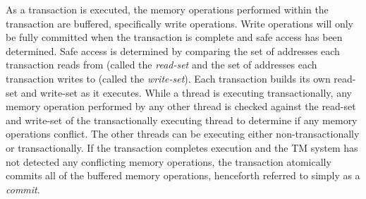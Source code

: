 \documentclass[11pt]{book}
\begin{document}





As a transaction is executed, the memory operations performed within the transaction are
buffered, specifically write operations.  Write operations will only be fully committed
when the transaction is complete and safe access has been determined.  Safe access is
determined by comparing the set of addresses each transaction reads from (called the
\emph{read-set} and the set of addresses each transaction writes to (called the
\emph{write-set}).  Each transaction builds its own read-set and write-set as it
executes.  While a thread is executing transactionally, any memory operation
performed by any other thread is checked against the read-set and write-set of
the transactionally executing thread to determine if any memory operations
conflict.  The other threads can be executing either non-transactionally or
transactionally.  If the transaction completes execution and the TM system has
not detected any conflicting memory operations, the transaction atomically
commits all of the buffered memory operations, henceforth referred to simply as
a \emph{commit}.
\end{document}
